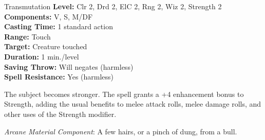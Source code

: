 {Transmutation}
{
	\textbf{Level:}
	Clr 2, Drd 2, ElC 2, Rng 2, Wiz 2, Strength 2\\
	\textbf{Components:}
	V, S, M/DF\\
	\textbf{Casting Time:}
	1 standard action\\
	\textbf{Range:}
	Touch\\
	\textbf{Target:}
	Creature touched\\
	\textbf{Duration:}
	1 min./level\\
	\textbf{Saving Throw:}
	Will negates (harmless)\\
	\textbf{Spell Resistance:}
	Yes (harmless)\\
}
{
	The subject becomes stronger. The spell grants a +4 enhancement bonus to Strength, adding the usual benefits to melee attack rolls, melee damage rolls, and other uses of the Strength modifier.

	\textit{Arcane Material Component}:
	A few hairs, or a pinch of dung, from a bull.

}
